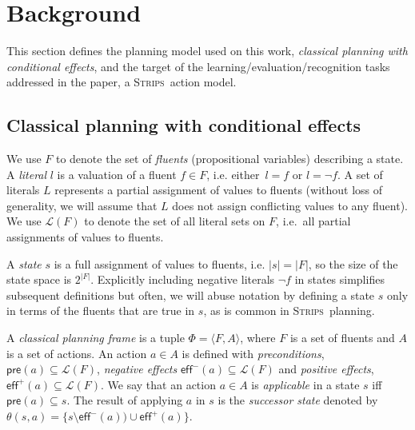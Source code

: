 \documentclass[3p,times]{elsarticle}
\newcommand{\pre}{\mathsf{pre}}  %
\newcommand{\eff}{\mathsf{eff}}  %
\newcommand{\strips}{\textsc{Strips}}     %
\newcommand{\tup}[1]{{\langle #1 \rangle}}
\begin{document}
\section{Background}
\label{sec:Section3}
This section defines the planning model used on this work, {\em classical planning with conditional effects}, and the target of the learning/evaluation/recognition tasks addressed in the paper, a \strips\ action model.

\subsection{Classical planning with conditional effects}
We use $F$ to denote the set of {\em fluents} (propositional variables) describing a state. A {\em literal} $l$ is a valuation of a fluent $f\in F$, i.e. either~$l=f$ or $l=\neg f$. A set of literals $L$ represents a partial assignment of values to fluents (without loss of generality, we will assume that $L$ does not assign conflicting values to any fluent). We use $\mathcal{L}(F)$ to denote the set of all literal sets on $F$, i.e.~all partial assignments of values to fluents.

A {\em state} $s$ is a full assignment of values to fluents, i.e. $|s|=|F|$, so the size of the state space is $2^{|F|}$. Explicitly including negative literals $\neg f$ in states simplifies subsequent definitions but often, we will abuse notation by defining a state $s$ only in terms of the fluents that are true in $s$, as is common in \strips\ planning.

A {\em classical planning frame} is a tuple $\Phi=\tup{F,A}$, where $F$ is a set of fluents and $A$ is a set of actions. An action $a\in A$ is defined with {\em preconditions}, $\pre(a)\subseteq\mathcal{L}(F)$, {\em negative effects} $\eff^-(a)\subseteq\mathcal{L}(F)$ and {\em positive effects}, $\eff^+(a)\subseteq\mathcal{L}(F)$. We say that an action $a\in A$ is {\em applicable} in a state $s$ iff $\pre(a)\subseteq s$. The result of applying $a$ in $s$ is the {\em successor state} denoted by $\theta(s,a)=\{s\setminus\eff^-(a))\cup\eff^+(a)\}$.

\end{document}
